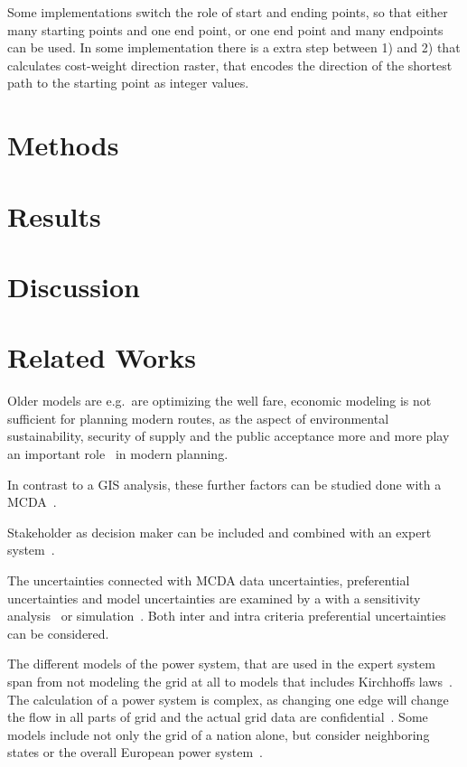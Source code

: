 \documentclass[acmtog]{acmart}
\begin{document}
	Some implementations switch the role of start and ending points, so that either many starting points and one end point, or one end point and many endpoints can be used.
	In some implementation there is a extra step between 1) and 2) that calculates cost-weight direction raster, that encodes the direction of the shortest
	path to the starting point as integer values.

	\section{Methods}\label{sec:methods}
	

	\section{Results}\label{sec:results}
	
	
	\section{Discussion}\label{sec:discussion}
	

	\section{Related Works}\label{sec:related-works}

	
	
	Older models are e.g.\ are optimizing the well fare, economic modeling is not sufficient for planning modern routes, as the aspect of environmental sustainability, security of supply and the public acceptance more and more play an important role~\cite{hauff_gesellschaftliche_2011} in modern planning.
	
	In contrast to a GIS analysis, these further factors can be studied done with a \acrfull{MCDA}~\cite{bertsch_participatory_2016}.

	Stakeholder as decision maker can be included and combined with an expert system~\cite{bertsch_participatory_2016}.
	
	The uncertainties connected with \acrshort{MCDA} data uncertainties, preferential uncertainties and model uncertainties are examined by a with a sensitivity analysis~\cite{bertsch_participatory_2016} or simulation~\cite{butler_simulation_1997}.
	Both inter and intra criteria preferential uncertainties~\cite{bertsch_sensitivity_2007} can be considered.
		
	The different models of the power system, that are used in the expert system span from not modeling the grid at all to models that includes Kirchhoffs laws~\cite{bertsch_participatory_2016}.
	The calculation of a power system is complex, as changing one edge will change the flow in all parts of grid and the actual grid data are confidential~\cite{bertsch_participatory_2016}.
	Some models include not only the grid of a nation alone, but consider neighboring states or the overall European power system~\cite{dietrich_will_2010}.
\end{document}
